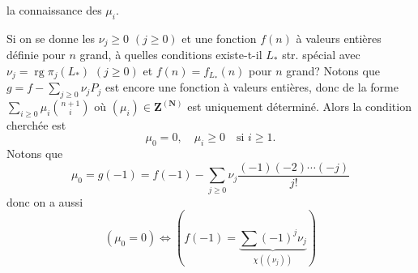la connaissance des $\mu_i$.

Si on se donne les  $\nu_j\geq0$
$(j\geq0)$ et une fonction  $f(n)$ à valeurs
entières définie pour $n$ grand, à quelles
conditions existe-t-il $L_*$ str. spécial
avec $\nu_j=\operatorname{rg}\pi_j(L_*)$ $(j\geq0)$ et
$f(n)=f_{L_*}(n)$ pour $n$ grand? Notons
que $g=f-\sum_{j\geq0}\nu_jP_j$ est encore une
fonction   à valeurs entières,
donc de la forme $\sum_{i\geq0}\mu_i\binom{n+1}{i}$
où $(\mu_i)\in\mathbf Z^{(\mathbf N)}$ est uniquement déterminé.
Alors la condition cherchée est
\[
\mu_0=0,\quad\mu_i\geq0\quad\text{si }i\geq1.
\]
Notons que 
\[
\mu_0=g(-1)=f(-1)-\sum_{j\geq0}\nu_j
\frac{(-1)(-2)\cdots(-j)}{j!}
\]
donc on a aussi
\[
(\mu_0=0)\Longleftrightarrow
\left(f(-1)=\underset{\chi((\nu_j))}{\underbrace{\sum(-1)^j\nu_j}}\right)
\]


